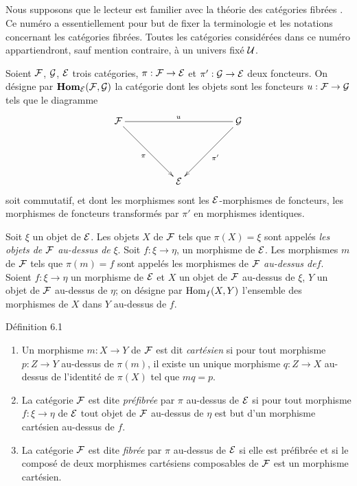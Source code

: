 \documentclass[10pt]{../fichiers-configuration-latex/smfart}
\begin{document}
\setcounter{subsection}{-1}
\subsection{}

Nous supposons que le lecteur est familier avec la théorie des
catégories fibrées \cite{SGA4-06:5}. Ce numéro a essentiellement pour but de fixer
la terminologie et les notations concernant les catégories
fibrées. Toutes les catégories considérées dans ce numéro
appartiendront, sauf mention contraire, à un univers fixé
${\mathcal U}$.

Soient ${\mathcal F}$, ${\mathcal G}$, ${\mathcal E}$ trois catégories,
$\pi : \Ff \to \Ee$ et ${\pi}' : \Gg \to
\Ee$ deux foncteurs. On désigne par
$\operatorname{\mathbf{Hom}}_{{\mathcal E}}({\mathcal F}, {\mathcal G})$ la catégorie dont les
  objets sont les foncteurs $u : \Ff \to \Gg$ tels que
  le diagramme
\[
\xymatrix@=1.75cm{
\Ff \ar@{-}[rr]^{u} \ar[rd]_{\pi}&             &\Gg \ar[ld]^{\pi'}\\
           & \Ee &
}\]
soit commutatif, et dont les morphismes sont les
${\mathcal E}$-morphismes de foncteurs, \ie les morphismes de foncteurs
transformés par $\pi'$ en morphismes identiques.

Soit $\xi$ un objet de ${\mathcal E}$. Les objets $X$ de
${\mathcal F}$ tels que $\pi (X) = \xi$ sont appelés \emph{les objets
  de ${\mathcal F}$ au-dessus de} $\xi$. Soit $f : \xi \to \eta$, un
morphisme de ${\mathcal E}$. Les morphismes $m$ de ${\mathcal F}$ tels
que $\pi(m) = f$ sont appelés les morphismes de ${\mathcal F}$
\emph{au-dessus de}\pageoriginale $f$. Soient $f : \xi \to \eta$ un
morphisme de ${\mathcal E}$ et $X$ un objet de ${\mathcal F}$ au-dessus de $\xi$, $Y$
un objet de ${\mathcal F}$ au-dessus de $\eta$; on désigne par
$\operatorname{Hom}_f(X, Y)$ l'ensemble des morphismes de $X$ dans $Y$ au-dessus de $f$.

\begin{enonce*}{Définition 6.1}
\begin{enumerate}
\renewcommand{\labelenumi}{\theenumi)}
\item Un morphisme $m : X \to Y$ de ${\mathcal F}$ est dit \emph{cartésien} si
  pour tout morphisme $p : Z \to Y$ au-dessus de $\pi (m)$, il existe
  un unique morphisme $q : Z \to X$ au-dessus de l'identité de $\pi
  (X)$ tel que $m q = p$.

\item La catégorie ${\mathcal F}$ est dite \emph{préfibrée} par $\pi$
  au-dessus de ${\mathcal E}$ si pour tout morphisme $f : \xi \to \eta$
  de ${\mathcal E}$  tout objet de ${\mathcal F}$ au-dessus de $\eta$
  est but d'un morphisme cartésien au-dessus de $f$.

\item La catégorie ${\mathcal F}$ est dite \emph{fibrée} par $\pi$ au-dessus
  de ${\mathcal E}$ si elle est préfibrée et si le composé de deux
  morphismes cartésiens composables de ${\mathcal F}$ est un morphisme
  cartésien.
\end{enumerate}
\end{enonce*}
\end{document}
